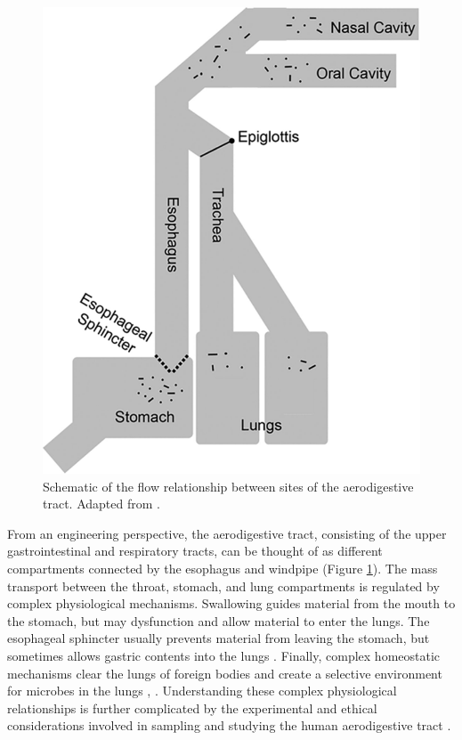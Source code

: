 \documentclass[12pt]{article}
\begin{document}
\begin{figure}
\begin{center}
    \includegraphics[scale=0.35]{aero_tract}
    \caption{Schematic of the flow relationship between sites of the 
    aerodigestive tract. Adapted from \cite{bassis-source-2015}.}\label{fig:aero_tract}
\end{center}
\end{figure}

From an engineering perspective, the aerodigestive tract,
consisting of the upper gastrointestinal and respiratory tracts,
can be thought of as different compartments connected by the esophagus and windpipe (Figure \ref{fig:aero_tract}).
The mass transport between the throat, stomach, and lung compartments is regulated by complex physiological 
mechanisms. Swallowing guides material from the mouth to the stomach, 
but may dysfunction and allow material to enter the lungs. The 
esophageal sphincter usually prevents material from leaving the 
stomach, but sometimes allows gastric contents into the lungs \cite{beck-lung-2012}. Finally, complex 
homeostatic mechanisms clear the lungs of foreign bodies and create a 
selective environment for microbes in the lungs \cite{martinharris-mbs-2008}, \cite{dickson-lung_microbiome-2014}. 
Understanding these complex physiological relationships is further complicated
by the experimental and ethical considerations involved in
sampling and studying the human aerodigestive tract \cite{beck-lung-2012}.
\end{document}
